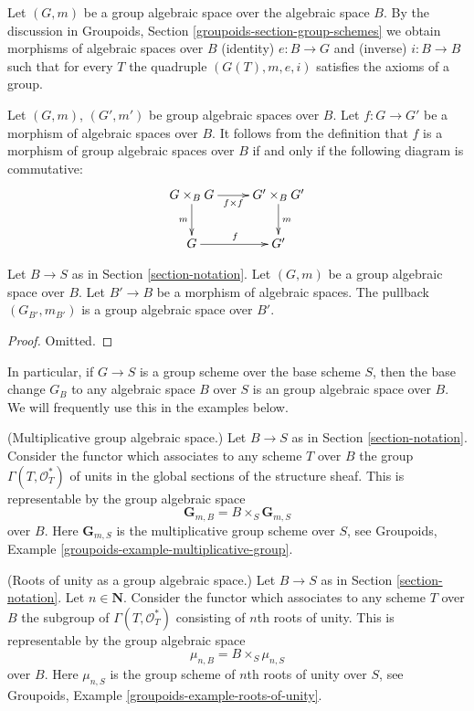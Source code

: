 \noindent
Let $(G, m)$ be a group algebraic space over the algebraic space $B$.
By the discussion in
Groupoids, Section \ref{groupoids-section-group-schemes}
we obtain morphisms of algebraic spaces over $B$
(identity) $e : B \to G$ and (inverse) $i : B \to B$ such that
for every $T$ the quadruple $(G(T), m, e, i)$ satisfies the
axioms of a group.

\medskip\noindent
Let $(G, m)$, $(G', m')$ be group algebraic spaces over $B$.
Let $f : G \to G'$ be a morphism of algebraic spaces over $B$.
It follows from the definition that $f$ is a morphism
of group algebraic spaces over $B$ if and only if the following diagram
is commutative:
$$
\xymatrix{
G \times_B G \ar[r]_-{f \times f} \ar[d]_m &
G' \times_B G' \ar[d]^m \\
G \ar[r]^f & G'
}
$$

\begin{lemma}
\label{lemma-base-change-group-space}
Let $B \to S$ as in Section \ref{section-notation}.
Let $(G, m)$ be a group algebraic space over $B$.
Let $B' \to B$ be a morphism of algebraic spaces.
The pullback $(G_{B'}, m_{B'})$ is a group algebraic space over $B'$.
\end{lemma}

\begin{proof}
Omitted.
\end{proof}

\noindent
In particular, if $G \to S$ is a group scheme over the base
scheme $S$, then the base change $G_B$ to any algebraic space
$B$ over $S$ is an group algebraic space over $B$. We will
frequently use this in the examples below.

\begin{example}
\label{example-multiplicative-group}
(Multiplicative group algebraic space.)
Let $B \to S$ as in Section \ref{section-notation}.
Consider the functor which associates to any scheme $T$ over
$B$ the group $\Gamma(T, \mathcal{O}_T^*)$
of units in the global sections of the structure sheaf.
This is representable by the group algebraic space
$$
\mathbf{G}_{m, B} = B \times_S \mathbf{G}_{m, S}
$$
over $B$. Here $\mathbf{G}_{m, S}$ is the multiplicative group scheme
over $S$, see
Groupoids, Example \ref{groupoids-example-multiplicative-group}.
\end{example}

\begin{example}
\label{example-roots-of-unity}
(Roots of unity as a group algebraic space.)
Let $B \to S$ as in Section \ref{section-notation}.
Let $n \in \mathbf{N}$. Consider the functor which associates
to any scheme $T$ over $B$ the subgroup of $\Gamma(T, \mathcal{O}_T^*)$
consisting of $n$th roots of unity.
This is representable by the group algebraic space
$$
\mu_{n, B} = B \times_S \mu_{n, S}
$$
over $B$. Here $\mu_{n, S}$ is the group scheme of $n$th roots of
unity over $S$, see
Groupoids, Example \ref{groupoids-example-roots-of-unity}.
\end{example}

